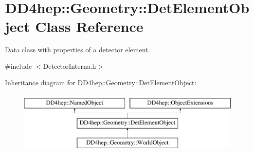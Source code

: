 \hypertarget{class_d_d4hep_1_1_geometry_1_1_det_element_object}{}\section{D\+D4hep\+:\+:Geometry\+:\+:Det\+Element\+Object Class Reference}
\label{class_d_d4hep_1_1_geometry_1_1_det_element_object}


Data class with properties of a detector element.  




{\ttfamily \#include $<$Detector\+Interna.\+h$>$}

Inheritance diagram for D\+D4hep\+:\+:Geometry\+:\+:Det\+Element\+Object\+:\begin{figure}[H]
\begin{center}
\leavevmode
\includegraphics[height=3.000000cm]{class_d_d4hep_1_1_geometry_1_1_det_element_object}
\end{center}
\end{figure}
